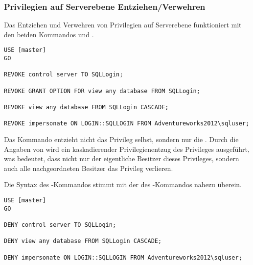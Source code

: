         \subsubsection{Privilegien auf Serverebene Entziehen/Verwehren}
          Das Entziehen und Verwehren von Privilegien auf Serverebene
          funktioniert mit den beiden Kommandos  und
          .
          \begin{lstlisting}[language=ms_sql, caption={Privilegien von
          einem Server- oder Login-Objekt entziehen}, label=admin19_05b]
USE [master]
GO

REVOKE control server TO SQLLogin;

REVOKE GRANT OPTION FOR view any database FROM SQLLogin;

REVOKE view any database FROM SQLLogin CASCADE;

REVOKE impersonate ON LOGIN::SQLLOGIN FROM Adventureworks2012\sqluser;
          \end{lstlisting}
          Das Kommando  entzieht nicht das
          Privileg selbst, sondern nur die . Durch die
          Angaben von  wird ein kaskadierender
          Privilegienentzug des  Privileges
          ausgeführt, was bedeutet, dass nicht nur der eigentliche Besitzer dieses
          Privileges, sondern auch alle nachgeordneten Besitzer das
           Privileg verlieren.
          
          Die Syntax des -Kommandos stimmt mit der des
          -Kommandos nahezu überein.
          \begin{lstlisting}[language=ms_sql, caption={Privilegien von
          einem Server- oder Login-Objekt entziehen}, label=admin19_05c]
USE [master]
GO

DENY control server TO SQLLogin;

DENY view any database FROM SQLLogin CASCADE;

DENY impersonate ON LOGIN::SQLLOGIN FROM Adventureworks2012\sqluser;
          \end{lstlisting}

          \begin{literaturinternet}
            \item \cite{ms186226}
            \item \cite{ms186710}
          \end{literaturinternet}    

